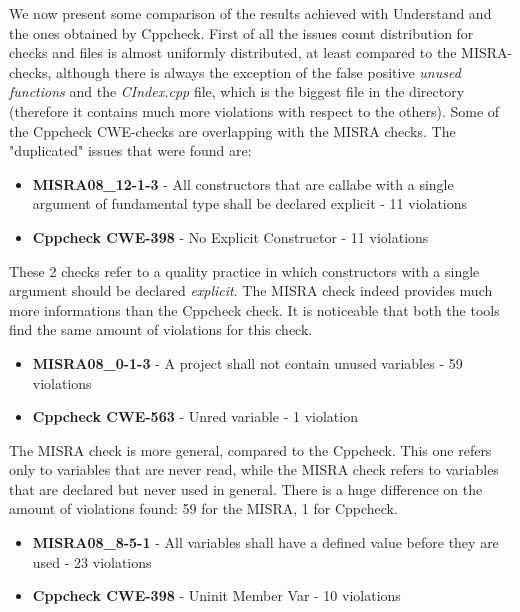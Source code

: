 We now present some comparison of the results achieved with Understand and the ones obtained by Cppcheck.\newline
First of all the issues count distribution for checks and files is almost uniformly distributed, at least compared to the MISRA-checks, although there is always the exception of the false positive \textsl{unused functions} and the \textsl{CIndex.cpp} file, which is the biggest file in the directory (therefore it contains much more violations with respect to the others).\newline\newline
Some of the Cppcheck CWE-checks are overlapping with the MISRA checks. The "duplicated" issues that were found are:

\begin{itemize}
	\item \textbf{MISRA08\_12-1-3} - All constructors that are callabe with a single argument of fundamental type shall be declared explicit - 11 violations
	\item \textbf{Cppcheck CWE-398} - No Explicit Constructor - 11 violations
\end{itemize}

These 2 checks refer to a quality practice in which constructors with a single argument should be declared \textsl{explicit}. The MISRA check indeed provides much more informations than the Cppcheck check.\newline
It is noticeable that both the tools find the same amount of violations for this check.

\begin{itemize}
	\item \textbf{MISRA08\_0-1-3} - A project shall not contain unused variables - 59 violations
	\item \textbf{Cppcheck CWE-563} - Unred variable - 1 violation
\end{itemize}

The MISRA check is more general, compared to the Cppcheck. This one refers only to variables that are never read, while the MISRA check refers to variables that are declared but never used in general. There is a huge difference on the amount of violations found: 59 for the MISRA, 1 for Cppcheck.

\begin{itemize}
	\item \textbf{MISRA08\_8-5-1} - All variables shall have a defined value before they are used - 23 violations
	\item \textbf{Cppcheck CWE-398} - Uninit Member Var - 10 violations
\end{itemize}

